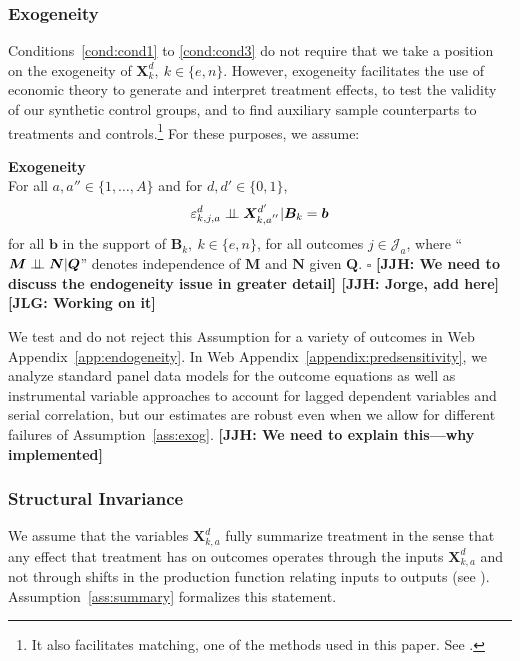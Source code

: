 \subsubsection{Exogeneity}

Conditions~\ref{cond:cond1} to \ref{cond:cond3} do not require that we take a position on the exogeneity of $\bm{X}^d_k, \: k \in \{e,n\}$. However, exogeneity facilitates the use of economic theory to generate and interpret treatment effects, to test the validity of our synthetic control groups, and to find auxiliary sample counterparts to treatments and controls.\footnote{It also facilitates matching, one of the methods used in this paper. See \cite{Heckman_Navarro_2004_REStat}.} For these purposes, we assume:

\onehalfspacing
\begin{assumption}\label{ass:exog} \textbf{Exogeneity}\\
For all $a, a'' \in \{ 1, \ldots, A \}$ and for $d, d' \in \{0,1\}$,
\begin{equation}
\varepsilon^d_{k,j,a} \perp\!\!\!\perp \bm{X}^{d^{\prime}}_{k,a^{''}} | \bm{B}_k = \bm{b}
\end{equation}
for all $\bm{b}$ in the support of $\bm{B}_k, \: k \in \{e,n\}$, for all outcomes $j \in \mathcal{J}_{a}$, where ``$\bm{M} \perp\!\!\!\perp \bm{N}|\bm{Q}$'' denotes independence of $\bm{M}$ and $\bm{N}$ given $\bm{Q}$. $\square$  \textbf{[JJH: We need to discuss the endogeneity issue in greater detail] [JJH: Jorge, add here] [JLG: Working on it]}
\end{assumption}
\doublespacing

\noindent We test and do not reject this Assumption for a variety of outcomes in Web Appendix~\ref{app:endogeneity}. In Web Appendix~\ref{appendix:predsensitivity}, we analyze standard panel data models for the outcome equations as well as instrumental variable approaches to account for lagged dependent variables and serial correlation, but our estimates are robust even when we allow for different failures of Assumption~\ref{ass:exog}.  \textbf{[JJH: We need to explain this---why implemented]}

\subsubsection{Structural Invariance}

We assume that the variables $\bm{X}_{k,a}^d$ fully summarize treatment in the sense that any effect that treatment has on outcomes operates through the inputs $\bm{X}_{k,a}^d$ and not through shifts in the production function relating inputs to outputs (see \citealp{Heckman_Pinto_etal_2013_PerryFactor}). Assumption~\ref{ass:summary} formalizes this statement.

